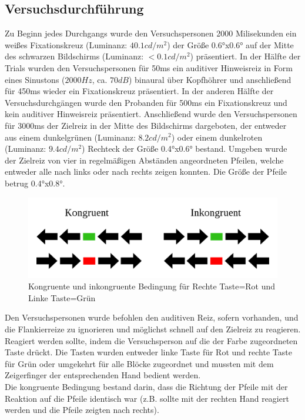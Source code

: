 \subsection{Versuchsdurchführung}
Zu Beginn jedes Durchgangs wurde den Versuchspersonen 2000 Milisekunden ein weißes Fixationskreuz (Luminanz: $40.1 cd/m^2$) der Größe 0.6°x0.6° auf der Mitte des schwarzen Bildschirms (Luminanz: $< 0.1cd/m^2$) präsentiert. In der Hälfte der Trials wurden den Versuchspersonen für 50ms ein auditiver Hinweisreiz in Form eines Sinustons ($2000 Hz$, ca. $70dB$) binaural über Kopfhöhrer und anschließend für 450ms wieder ein Fixationskreuz präsentiert. In der anderen Hälfte der Versuchsdurchgängen wurde den Probanden für 500ms ein Fixationskreuz und kein auditiver Hinweisreiz präsentiert.
Anschließend wurde den Versuchspersonen für 3000ms der Zielreiz in der Mitte des Bildschirms dargeboten, der entweder aus einem dunkelgrünen (Luminanz: $8.2 cd/m^2$) oder einem dunkelroten (Luminanz: $9.4 cd/m^2$) Rechteck der Größe 0.4°x0.6° bestand. Umgeben wurde der Zielreiz von vier in regelmäßigen Abständen angeordneten Pfeilen, welche entweder alle nach links oder nach rechts zeigen konnten. Die Größe der Pfeile betrug 0.4°x0.8°.\\
\begin{figure}[t]
	\centering
	 \includegraphics[width=\textwidth]{grafiken/Kongruenz.png}
		\caption{Kongruente und inkongruente Bedingung für Rechte Taste=Rot und Linke Taste=Grün}
		\label{fig:kong} 
\end{figure}
Den Versuchspersonen wurde befohlen den auditiven Reiz, sofern vorhanden, und die Flankierreize zu ignorieren und möglichst schnell auf den Zielreiz zu reagieren. Reagiert werden sollte, indem die Versuchsperson auf die der Farbe zugeordneten Taste drückt. Die Tasten wurden entweder linke Taste für Rot und rechte Taste für Grün oder umgekehrt für alle Blöcke zugeordnet und mussten mit dem Zeigerfinger der entsprechenden Hand bedient werden.\\
Die kongruente Bedingung bestand darin, dass die Richtung der Pfeile mit der Reaktion auf die Pfeile identisch war (z.B. sollte mit der rechten Hand reagiert werden und die Pfeile zeigten nach rechts).
